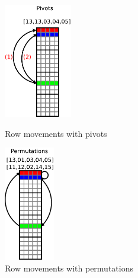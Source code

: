 \begin{figure}[!ht]
\begin{minipage}[!ht]{.4\textwidth}
\centering
\includegraphics[height=5cm]{figures/pivots.pdf}
\caption{Row movements with pivots\label{fig:pivots}}
\end{minipage} \hfill
\begin{minipage}[!ht]{.4\textwidth}
\centering
\includegraphics[height=5cm]{figures/permutations.pdf}
\caption{Row movements with permutations\label{fig:permutations}}
\end{minipage}
\end{figure}

